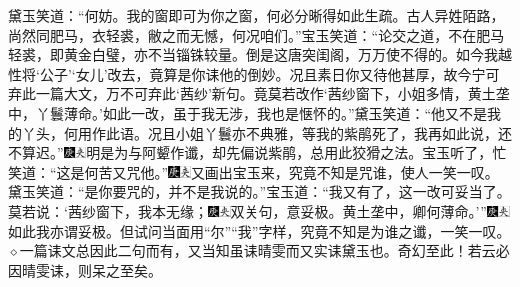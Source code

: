 黛玉笑道：“何妨。我的窗即可为你之窗，何必分晰得如此生疏。古人异姓陌路，尚然同肥马，衣轻裘，敝之而无憾，何况咱们。”宝玉笑道：“论交之道，不在肥马轻裘，即黄金白璧，亦不当锱铢较量。倒是这唐突闺阁，万万使不得的。如今我越性将‘公子’‘女儿’改去，竟算是你诔他的倒妙。况且素日你又待他甚厚，故今宁可弃此一篇大文，万不可弃此‘茜纱’新句。竟莫若改作‘茜纱窗下，小姐多情，黄土垄中，丫鬟薄命。’如此一改，虽于我无涉，我也是惬怀的。”黛玉笑道：“他又不是我的丫头，何用作此语。况且小姐丫鬟亦不典雅，等我的紫鹃死了，我再如此说，还不算迟。”{\includegraphics[width=3mm]{../Images/00004}\includegraphics[width=3mm]{../Images/00012}\footnotesize \kaishu 明是为与阿颦作谶，却先偏说紫鹃，总用此狡猾之法。}宝玉听了，忙笑道：“这是何苦又咒他。”{\includegraphics[width=3mm]{../Images/00004}\includegraphics[width=3mm]{../Images/00012}\footnotesize \kaishu 又画出宝玉来，究竟不知是咒谁，使人一笑一叹。}黛玉笑道：“是你要咒的，并不是我说的。”宝玉道：“我又有了，这一改可妥当了。莫若说：‘茜纱窗下，我本无缘；{\includegraphics[width=3mm]{../Images/00004}\includegraphics[width=3mm]{../Images/00012}\footnotesize \kaishu 双关句，意妥极。}黄土垄中，卿何薄命。’”{\includegraphics[width=3mm]{../Images/00004}\includegraphics[width=3mm]{../Images/00012}\footnotesize \kaishu 如此我亦谓妥极。但试问当面用“尔”“我”字样，究竟不知是为谁之谶，一笑一叹。{$\diamond$}一篇诔文总因此二句而有，又当知虽诔晴雯而又实诔黛玉也。奇幻至此！若云必因晴雯诔，则呆之至矣。}

